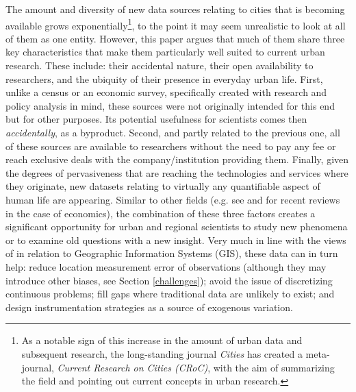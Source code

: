 \documentclass[12pt]{article}
\begin{document}
The amount and diversity of new data sources relating to cities that is
becoming available grows exponentially\footnote{As a notable sign of this
increase in the amount of urban data and subsequent research, the
long-standing journal \emph{Cities} has created a meta-journal,
\emph{Current Research on Cities (CRoC)}, with the aim of summarizing the
field and pointing out current concepts in urban research.}, to the point it may seem
unrealistic to look at all of them as one entity. 
%
However, this paper argues that much of them share three key characteristics
that make them particularly well suited to current urban research. These
include:
their accidental nature, their open availability to
researchers, and the ubiquity of their presence in everyday urban life.
First, unlike a census or an economic survey, specifically created
with research and policy analysis in mind, these sources were not originally
intended for this end but for other purposes. Its potential usefulness for
scientists comes then \emph{accidentally}, as a byproduct.
%
Second, and partly related to the previous one, all of these sources
are available to researchers without the
need to pay any fee or reach exclusive deals with the company/institution
providing them.
Finally, given the degrees of pervasiveness
that are reaching the technologies and services where they originate, new
datasets relating to virtually any quantifiable aspect of human life are appearing.
Similar to other fields (e.g. see \citealp{edelman2012jep} and
\citealp{einav2013bigdata} for recent reviews in the
case of economics), the combination of these three factors creates a
significant opportunity for urban and regional scientists to study
new phenomena or to examine old questions with a new insight.
%
Very much in line with the views of \cite{overman2010gis} in relation to
Geographic Information Systems (GIS), these data can in turn help: reduce location measurement error
of observations (although they may introduce other biases, see Section
\ref{challenges}); avoid the issue of discretizing continuous problems; fill
gaps where traditional data are unlikely to exist; and design
instrumentation strategies as a source of exogenous variation.
\end{document}
